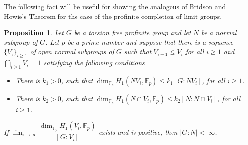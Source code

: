 \documentclass[10pt]{amsart}
\theoremstyle{plain}
\newtheorem{prop}{Proposition}
\theoremstyle{definition}
\theoremstyle{remark}
\numberwithin{prop}{section}
\numberwithin{example}{section}
\numberwithin{equation}{section}
\newcommand{\F}{\mathbb{F}}
\begin{document}
The following fact will  be useful for  showing the analogous of  Bridson and  Howie's Theorem  for the case of the profinite completion  of limit groups.
	\begin{prop}\label{p:4}
		Let $G$ be a torsion free profinite group  and let $N$ be  a normal subgroup of $G$.  Let   $p$ be  a prime number and suppose that there is   a  sequence $\{V_{i}\}_{i\geq 1}$ of open normal  subgroups    of ${G}$  such that   $V_{i+1}\leq V_i$ for all  $i\geq 1$ and  $\displaystyle\bigcap_{i\geq 1}{V_i}=1$  satisfying the following conditions
		\begin{itemize}
			\item[$(i)$] There is $k_1>0$, such that  $\dim_{\F_p}H_1(NV_i,\F_p)\leq k_1[G: NV_i]$, for all $i\geq 1$. 
			\item[$(ii)$] There is  $k_2>0$, such that  $\dim_{\F_p}H_1(N\cap V_i,\F_p)\leq k_2[N:N\cap V_i]$, for all $i\geq 1$.
		\end{itemize}  If $\displaystyle\lim_{i\rightarrow\infty}    \displaystyle{\dfrac{\dim_{\F_p}H_1(V_i,{\F_p})}{[G:V_i]}}$ exists and  is  positive, then $|G:N|<~\infty$.
	\end{prop}
	
\end{document}
